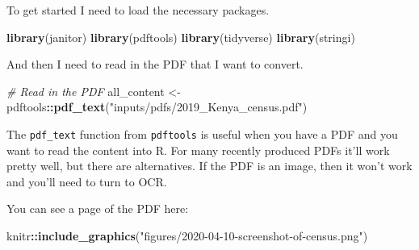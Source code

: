 \documentclass[
]{book}
\newenvironment{Shaded}{\begin{snugshade}}{\end{snugshade}}
\newcommand{\CommentTok}[1]{\textcolor[rgb]{0.56,0.35,0.01}{\textit{#1}}}
\newcommand{\KeywordTok}[1]{\textcolor[rgb]{0.13,0.29,0.53}{\textbf{#1}}}
\newcommand{\NormalTok}[1]{#1}
\newcommand{\OperatorTok}[1]{\textcolor[rgb]{0.81,0.36,0.00}{\textbf{#1}}}
\newcommand{\StringTok}[1]{\textcolor[rgb]{0.31,0.60,0.02}{#1}}
\begin{document}
To get started I need to load the necessary packages.

\begin{Shaded}
\begin{Highlighting}[]
\KeywordTok{library}\NormalTok{(janitor)}
\KeywordTok{library}\NormalTok{(pdftools)}
\KeywordTok{library}\NormalTok{(tidyverse)}
\KeywordTok{library}\NormalTok{(stringi)}
\end{Highlighting}
\end{Shaded}

And then I need to read in the PDF that I want to convert.

\begin{Shaded}
\begin{Highlighting}[]
\CommentTok{# Read in the PDF}
\NormalTok{all_content <-}\StringTok{ }\NormalTok{pdftools}\OperatorTok{::}\KeywordTok{pdf_text}\NormalTok{(}\StringTok{"inputs/pdfs/2019_Kenya_census.pdf"}\NormalTok{)}
\end{Highlighting}
\end{Shaded}

The \texttt{pdf\_text} function from \texttt{pdftools} is useful when you have a PDF and you want to read the content into R. For many recently produced PDFs it'll work pretty well, but there are alternatives. If the PDF is an image, then it won't work and you'll need to turn to OCR.

You can see a page of the PDF here:

\begin{Shaded}
\begin{Highlighting}[]
\NormalTok{knitr}\OperatorTok{::}\KeywordTok{include_graphics}\NormalTok{(}\StringTok{"figures/2020-04-10-screenshot-of-census.png"}\NormalTok{) }
\end{Highlighting}
\end{Shaded}
\end{document}
